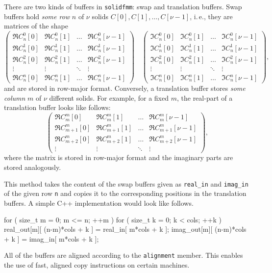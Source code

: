 \documentclass{scrbook}
\newcommand{\solidfmm}{\texttt{solidfmm}}
\begin{document}
There are two kinds of buffers in \solidfmm: swap and translation
buffers. Swap buffers hold \emph{some row} $n$ of $\nu$ solids
$C[0],C[1],\dotsc,C[\nu-1]$, i.\,e., they are matrices of the shape
\begin{equation*}
\begin{pmatrix}
\Re C_n^0[0] & \Re C_n^0[1] & \hdots & \Re C_n^0[\nu-1]\\
\Re C_n^1[0] & \Re C_n^1[1] & \hdots & \Re C_n^1[\nu-1]\\
\Re C_n^2[0] & \Re C_n^2[1] & \hdots & \Re C_n^2[\nu-1]\\
\vdots       & \vdots       & \ddots & \vdots          \\
\Re C_n^n[0] & \Re C_n^n[1] & \hdots & \Re C_n^n[\nu-1]
\end{pmatrix}\quad
\begin{pmatrix}
\Im C_n^0[0] & \Im C_n^0[1] & \hdots & \Im C_n^0[\nu-1]\\
\Im C_n^1[0] & \Im C_n^1[1] & \hdots & \Im C_n^1[\nu-1]\\
\Im C_n^2[0] & \Im C_n^2[1] & \hdots & \Im C_n^2[\nu-1]\\
\vdots       & \vdots       & \ddots & \vdots          \\
\Im C_n^n[0] & \Im C_n^n[1] & \hdots & \Im C_n^n[\nu-1]
\end{pmatrix},
\end{equation*}
and are stored in row-major format. Conversely, a translation buffer stores
\emph{some column} $m$ of $\nu$ different solids. For example, for a fixed
$m$, the real-part of a translation buffer looks like follows:
\begin{equation*}
\begin{pmatrix}
\Re C_m^m[0]     & \Re C_m^m[1]     & \hdots & \Re C_m^m[\nu-1]    \\
\Re C_{m+1}^m[0] & \Re C_{m+1}^m[1] & \hdots & \Re C_{m+1}^m[\nu-1]\\
\Re C_{m+2}^m[0] & \Re C_{m+2}^m[1] & \hdots & \Re C_{m+2}^m[\nu-1]\\
\vdots           & \vdots           & \ddots & \vdots              
\end{pmatrix},
\end{equation*}
where the matrix is stored in row-major format and the imaginary
parts are stored analogously.

This method takes the content of the swap buffers given as
\lstinline|real_in| and \lstinline|imag_in| of the given row
\lstinline|n| and copies it to the corresponding positions in the translation
buffers. A simple C++ implementation would look like follows.
\begin{cppcode*}
for ( size_t m = 0; m <= n;    ++m )
for ( size_t k = 0; k <  cols; ++k )
{
    real_out[m][ (n-m)*cols + k ] = real_in[ m*cols + k ];
    imag_out[m][ (n-m)*cols + k ] = imag_in[ m*cols + k ];
}
\end{cppcode*}
All of the buffers are aligned according to the \lstinline|alignment| member.
This enables the use of fast, aligned copy instructions on certain
machines.
\end{document}
